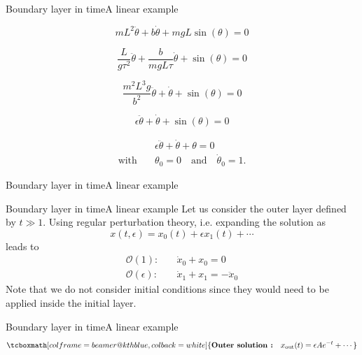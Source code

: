 \documentclass[usenames,dvipsnames,svgnames,10pt,aspectratio=169]{beamer}
\begin{document}
\begin{frame}[t, c]{Boundary layer in time}{A linear example}
  \begin{minipage}{.68\textwidth}
    \begin{overprint}
      \[
      mL^2 \ddot{\theta} + b \dot{\theta} + mgL \sin(\theta) = 0
      \]

      \[
      \dfrac{L}{g \tau^2} \ddot{\theta} + \dfrac{b}{mgL \tau} \dot{\theta} + \sin(\theta) = 0
      \]

      \[
       \dfrac{m^2 L^3 g}{b^2} \ddot{\theta} + \dot{\theta} + \sin(\theta) = 0
       \]

       \[
       \epsilon \ddot{\theta} + \dot{\theta} + \sin(\theta) = 0
       \]

       \[
       \begin{aligned}
         & \epsilon \ddot{\theta} + \dot{\theta} + \theta = 0 \\
         \text{with} \quad & \theta_0 = 0 \quad \text{and} \quad \dot{\theta}_0 = 1.
       \end{aligned}
       \]

    \end{overprint}
  \end{minipage}%
  \hfill
  \begin{minipage}{.28\textwidth}
  \end{minipage}
\end{frame}




\begin{frame}[t, c]{Boundary layer in time}{A linear example}
  \centering
\end{frame}




\begin{frame}[t, c]{Boundary layer in time}{A linear example}
  Let us consider the outer layer defined by $t \gg 1$.
  Using regular perturbation theory, i.e. expanding the solution as
  \[
  x(t, \epsilon) = x_0(t) + \epsilon x_1(t) + \cdots
  \]
  leads to
  \[
  \begin{aligned}
    \mathcal{O}(1) : \quad & \dot{x}_0 + x_0 = 0 \\
    \mathcal{O}(\epsilon) : \quad & \dot{x}_1 + x_1 = - \ddot{x}_0
  \end{aligned}
  \]
  Note that we do not consider initial conditions since they would need to be applied inside the initial layer.
\end{frame}


\begin{frame}[t, c]{Boundary layer in time}{A linear example}
  \[
  \tcboxmath[colframe=beamer@kthblue, colback=white]{
    \textbf{Outer solution :} \quad x_{\text{out}}(t) = \epsilon A e^{-t} + \cdots
  }
  \]
\end{frame}
\end{document}
